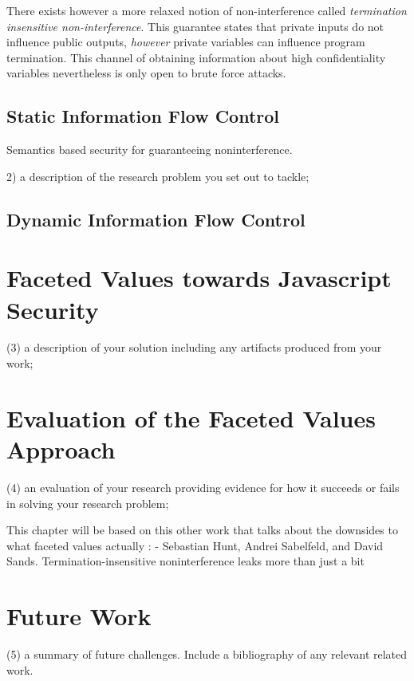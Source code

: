 \documentclass[11pt,letterpaper]{article}
\begin{document}
There exists however a more relaxed notion of non-interference called \textit{termination insensitive non-interference}. This guarantee states that private inputs do not influence public outputs, \textit{however} private variables can influence program termination. This channel of obtaining information about high confidentiality variables nevertheless is only open to brute force attacks.

\subsection*{Static Information Flow Control}
Semantics based security for guaranteeing noninterference. \cite{sabelfeld2003language}

2) a description of the research problem you set out to tackle;

\subsection*{Dynamic Information Flow Control}

\section*{Faceted Values towards Javascript Security}
(3) a description of your solution including any artifacts produced from your work;

\section*{Evaluation of the Faceted Values Approach}
(4) an evaluation of your research providing evidence for how it succeeds or fails in solving your research problem;

This chapter will be based on this other work that talks about the downsides to what faceted values actually :
- Sebastian Hunt, Andrei Sabelfeld, and David Sands. Termination-insensitive noninterference leaks more than just a bit

\section*{Future Work}
(5) a summary of future challenges. Include a bibliography of any relevant related work.



\end{document}
